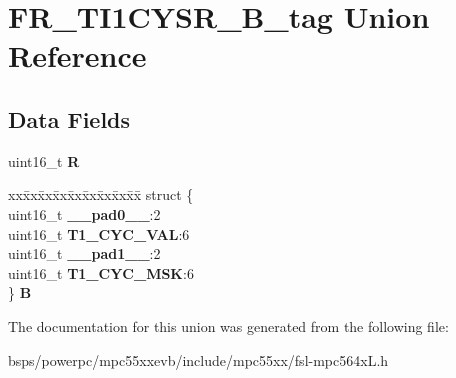 \hypertarget{unionFR__TI1CYSR__16B__tag}{}\section{F\+R\+\_\+\+T\+I1\+C\+Y\+S\+R\+\_\+B\+\_\+tag Union Reference}
\label{unionFR__TI1CYSR__16B__tag}
\subsection*{Data Fields}
\begin{DoxyCompactItemize}
\item 
\mbox{\label{unionFR__TI1CYSR__16B__tag_ad229fcd476f1cdfca9239ac2dd3909ac}} 
uint16\+\_\+t {\bfseries R}
\item 
\mbox{\label{unionFR__TI1CYSR__16B__tag_adf4473173f45791846d867a8dbf7aeac}} 
\begin{tabbing}
xx\=xx\=xx\=xx\=xx\=xx\=xx\=xx\=xx\=\kill
struct \{\\
\>uint16\_t {\bfseries \_\_pad0\_\_}:2\\
\>uint16\_t {\bfseries T1\_CYC\_VAL}:6\\
\>uint16\_t {\bfseries \_\_pad1\_\_}:2\\
\>uint16\_t {\bfseries T1\_CYC\_MSK}:6\\
\} {\bfseries B}\\

\end{tabbing}\end{DoxyCompactItemize}


The documentation for this union was generated from the following file\+:\begin{DoxyCompactItemize}
\item 
bsps/powerpc/mpc55xxevb/include/mpc55xx/fsl-\/mpc564x\+L.\+h\end{DoxyCompactItemize}
